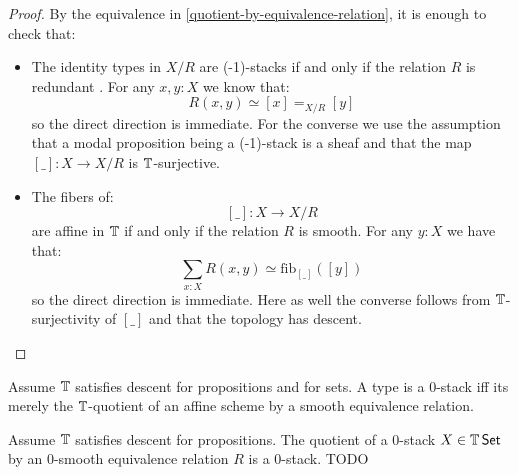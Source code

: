 \begin{proof}
	By the equivalence in \ref{quotient-by-equivalence-relation}, it is enough to check that:
	\begin{itemize}
		\item The identity types in $X/R$ are 
		(-1)-stacks if and only if the relation $R$ is redundant . For any $x,y:X$ we know that:
		\[R(x,y) \simeq [x] =_{X/R}[y]\]
		so the direct direction is immediate. For the converse we use the assumption that a modal proposition being a  (-1)-stack is a sheaf and that the map $[\_]:X\to X/R$ is $\mathbb{T}$-surjective.
		\item The fibers of: 
		\[[\_]:X\to X/R\] 
		are affine in $\mathbb{T}$ if and only if the relation $R$ is smooth. For any $y:X$ we have that:
		\[\sum_{x:X} R(x,y) \simeq \mathrm{fib}_{[\_]}([y])\]
		so the direct direction is immediate. Here as well the converse follows from $\mathbb{T}$-surjectivity of $[\_]$ and that the topology has descent.
	\end{itemize}
\end{proof}
\begin{corollary}
	Assume $\mathbb{T}$ satisfies descent for propositions and for sets.
	A type is a  0-stack iff its merely the $\mathbb{T}$-quotient of an affine scheme by a smooth equivalence relation.
\end{corollary}
\begin{theorem}{\label{thm:QuotientOfAlgebraicSpace}}
	Assume $\mathbb{T}$ satisfies descent for propositions. 
	The quotient of a  $0$-stack $X \in \mathbb{T} \operatorname{\mathsf {Set}}$ by an $0$-smooth equivalence relation $R$ is a  $0$-stack. TODO
\end{theorem}

